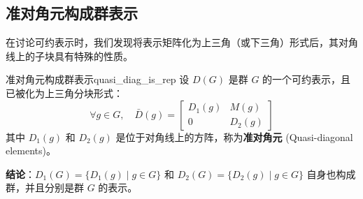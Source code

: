\subsection{准对角元构成群表示}
在讨论可约表示时，我们发现将表示矩阵化为上三角（或下三角）形式后，其对角线上的子块具有特殊的性质。

\begin{theorem}{准对角元构成群表示}{quasi_diag_is_rep}
    设 $D(G)$ 是群 $G$ 的一个可约表示，且已被化为上三角分块形式：
    \begin{equation}
        \forall g \in G, \quad \bar{D}(g) = \begin{bmatrix} D_1(g) & M(g) \\ 0 & D_2(g) \end{bmatrix}
    \end{equation}
    其中 $D_1(g)$ 和 $D_2(g)$ 是位于对角线上的方阵，称为\textbf{准对角元} (Quasi-diagonal elements)。
    
    \textbf{结论}：$D_1(G) = \{D_1(g) \mid g \in G\}$ 和 $D_2(G) = \{D_2(g) \mid g \in G\}$ 自身也构成群，并且分别是群 $G$ 的表示。
\end{theorem}

